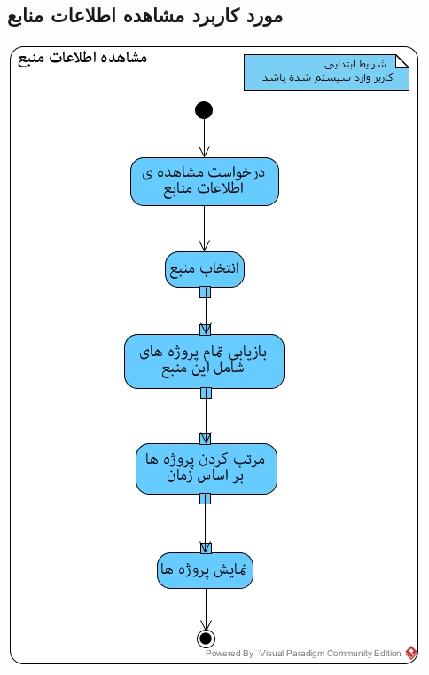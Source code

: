 \subsection*{مورد کاربرد مشاهده اطلاعات منابع}
\vspace{2cm}
\begin{center}
\includegraphics[width=\textwidth]{ActivityDiagrams/36.jpg}
\end{center}

\newpage
\vspace{2cm}
